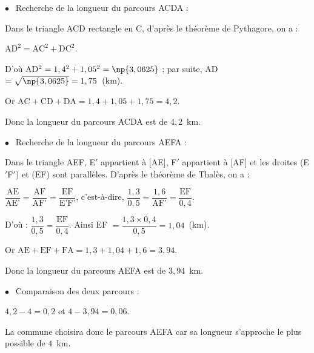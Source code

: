 
\medskip

$\bullet~~$ Recherche de la longueur du parcours ACDA :

Dans le triangle ACD rectangle en C, d'après le théorème de Pythagore, on a :

$\text{AD}^2 = \text{AC}^2 + \text{DC}^2$.

D'où AD$^2 = 1,4^2 + 1,05^2 = \np{3,0625}$ ; par suite, AD $= \sqrt{\np{3,0625}} = 1,75$~(km). 

Or $\text{AC} + \text{CD} + \text{DA} = 1,4 + 1,05 + 1,75 = 4,2$.

Donc la longueur du parcours ACDA est de $4,2$~km.

$\bullet~~$  Recherche de la longueur du parcours AEFA :

Dans le triangle AEF, E$'$ appartient à [AE], F$'$ appartient à [AF] et les droites (E$'$F$'$) et (EF) sont parallèles. D'après le théorème de Thalès, on a : 

$\dfrac{\text{AE}}{\text{AE'}} = \dfrac{\text{AF}}{\text{AF'}} = \dfrac{\text{EF}}{\text{E'}\text{F'}}$, c'est-à-dire, $\dfrac{1,3}{0,5} = \dfrac{1,6}{\text{AF'}} = \dfrac{\text{EF}}{0,4}$. 

D'où : $\dfrac{1,3}{0,5} = \dfrac{\text{EF}}{0,4}$. Ainsi EF $= \dfrac{1,3 \times 0,4}{0,5}  =1,04$~(km).

Or $\text{AE} + \text{EF}+ \text{FA} = 1,3 + 1,04 + 1,6 = 3,94$.

Donc la longueur du parcours AEFA est de $3,94$~km.

$\bullet~~$  Comparaison des deux parcours :

$4,2 - 4 = 0,2$ et $4 - 3,94 = 0,06$.

La commune choisira donc le parcours AEFA car sa longueur s'approche le plus possible de $4$~km.

\vspace{0,5cm}

